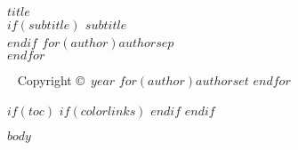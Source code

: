 \documentclass[11pt,twoside,openright]{memoir}
\begin{document}

\begingroup
\thispagestyle{empty}
{\bfseries\sffamily\noindent
{\Large $title$}\\[35pt] %
$if(subtitle)$ {\large $subtitle$}\\[50pt]$endif$ %
{\Large $for(author)$$author$$sep$\\$endfor$} %
}
\vfill
\endgroup



\newpage
~\vfill
\thispagestyle{empty}
\noindent Copyright \copyright\ $year$ $for(author)$$author$$set$ $endfor$\\ %
\clearpage


$if(toc)$
$if(colorlinks)$
\hypersetup{linkcolor=$if(toccolor)$$toccolor$$else$black$endif$}
$endif$
\setcounter{tocdepth}{1}
\pagestyle{empty} %
\tableofcontents %
\cleardoublepage %
$endif$



\pagestyle{Ruled}
$body$

\end{document}
